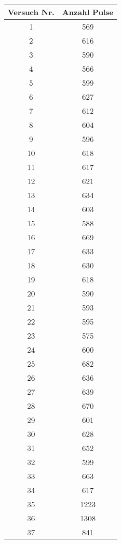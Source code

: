 \begin{table}[!h]
	\centering
	\begin{tabular}{|c|c|}
		\hline
		Versuch Nr. & Anzahl Pulse\\
\hline\hline
		\num{1} & \num{569}\\
		\num{2} & \num{616}\\
		\num{3} & \num{590}\\
		\num{4} & \num{566}\\
		\num{5} & \num{599}\\
		\num{6} & \num{627}\\
		\num{7} & \num{612}\\
		\num{8} & \num{604}\\
		\num{9} & \num{596}\\
		\num{10} & \num{618}\\
		\num{11} & \num{617}\\
		\num{12} & \num{621}\\
		\num{13} & \num{634}\\
		\num{14} & \num{603}\\
		\num{15} & \num{588}\\
		\num{16} & \num{669}\\
		\num{17} & \num{633}\\
		\num{18} & \num{630}\\
		\num{19} & \num{618}\\
		\num{20} & \num{590}\\
		\num{21} & \num{593}\\
		\num{22} & \num{595}\\
		\num{23} & \num{575}\\
		\num{24} & \num{600}\\
		\num{25} & \num{682}\\
		\num{26} & \num{636}\\
		\num{27} & \num{639}\\
		\num{28} & \num{670}\\
		\num{29} & \num{601}\\
		\num{30} & \num{628}\\
		\num{31} & \num{652}\\
		\num{32} & \num{599}\\
		\num{33} & \num{663}\\
		\num{34} & \num{617}\\
		\num{35} & \num{1223}\\
		\num{36} & \num{1308}\\
		\num{37} & \num{841}\\

\end{tabular}
\end{table}
